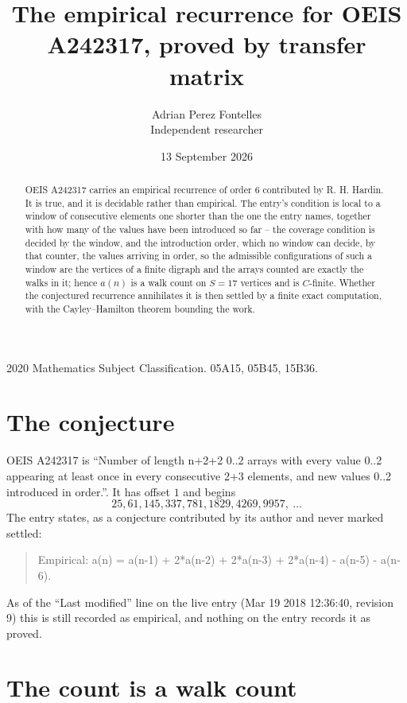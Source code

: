 \documentclass[11pt,a4paper]{article}
\title{The empirical recurrence for OEIS A242317, proved by transfer matrix}
\author{Adrian Perez Fontelles\\ \small Independent researcher}
\date{13 September 2026}
\theoremstyle{plain}
\theoremstyle{definition}
\begin{document}
\maketitle

\begin{abstract}
OEIS A242317 carries an empirical recurrence of order $6$ contributed by R. H. Hardin. It is
true, and it is decidable rather than empirical. The entry's condition is local to a window of consecutive elements one shorter than the one the entry names, together with how many of the values have been introduced so far -- the coverage condition is decided by the window, and the introduction order, which no window can decide, by that counter, the values arriving in order, so
the admissible configurations of such a window are the vertices of a finite digraph and the
arrays counted are exactly the walks in it; hence $a(n)$ is a walk count on $S=17$ vertices
and is $C$-finite. Whether the conjectured recurrence annihilates it is then settled by a
finite exact computation, with the Cayley--Hamilton theorem bounding the work.
\end{abstract}

\noindent\small 2020 Mathematics Subject Classification. 05A15, 05B45, 15B36.\normalsize

\section{The conjecture}

OEIS A242317 is ``Number of length n+2+2 0..2 arrays with every value 0..2 appearing at least once in every consecutive 2+3 elements, and new values 0..2 introduced in order.''. It has offset $1$ and begins
\[
25, 61, 145, 337, 781, 1829, 4269, 9957,\ \dots
\]
The entry states, as a conjecture contributed by its author and never marked settled:
\begin{quote}
Empirical: a(n) = a(n-1) + 2*a(n-2) + 2*a(n-3) + 2*a(n-4) - a(n-5) - a(n-6).
\end{quote}
As of the ``Last modified'' line on the live entry (Mar 19 2018 12:36:40, revision 9) this is still
recorded as empirical, and nothing on the entry records it as proved.

\section{The count is a walk count}
\end{document}
